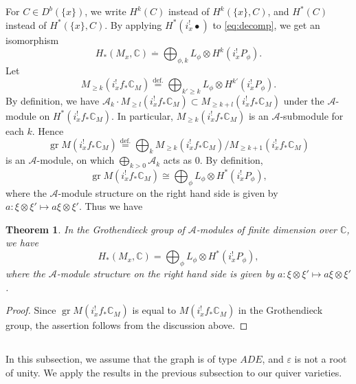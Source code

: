 \documentclass[12pt]{amsart}
\def\Bbb{\mathbb}
\newtheorem{Theorem}[equation]{Theorem}
\theoremstyle{definition}
\theoremstyle{remark}
\numberwithin{equation}{subsection}
\newcommand{\defeq}{\overset{\operatorname{\scriptstyle def.}}{=}}
\newcommand{\C}{{\Bbb C}}
\newcommand{\ngpiso}{\overset{.}{=}}
\begin{document}
For $C\in D^b(\{x\})$, we write $H^k(C)$ instead of $H^k(\{x\}, C)$,
and $H^*(C)$ instead of $H^*(\{x\}, C)$.
%
By applying $H^*(i_x^!\bullet)$ to \eqref{eq:decomp}, we get an
isomorphism
\begin{equation*}
   H_*(M_x,\C) \ngpiso
   \bigoplus_{\phi,k} L_{\phi}\otimes H^k(i_x^!P_\phi).
\end{equation*}
Let 
\[
 M_{\ge k}(i_x^!f_*\C_M) \defeq
  \bigoplus_{k'\ge k} L_{\phi}\otimes H^{k'}(i_x^!P_\phi).
\]
By definition, we have $\mathcal A_k\cdot M_{\ge l}(i_x^!f_*\C_M)
\subset M_{\ge k+l}(i_x^!f_*\C_M)$ under the $\mathcal A$-module on
$H^*(i_x^!f_*\C_M)$. In particular, $M_{\ge k}(i_x^!f_*\C_M)$ is
an $\mathcal A$-submodule for each $k$. Hence
\begin{equation*}
   \operatorname{gr} M(i_x^!f_*\C_M)
   \defeq \bigoplus_k  M_{\ge k}(i_x^!f_*\C_M)/ M_{\ge k+1}(i_x^!f_*\C_M)
\end{equation*}
is an $\mathcal A$-module, on which $\bigoplus_{k > 0} \mathcal A_k$
acts as $0$. By definition, 
\begin{equation*}
  \operatorname{gr} M(i_x^!f_*\C_M)
  \cong \bigoplus_\phi L_\phi\otimes H^*(i_x^!P_\phi),
\end{equation*}
where the $\mathcal A$-module structure on the right hand side is
given by
$a\colon \xi\otimes\xi'\mapsto a\xi\otimes\xi'$.
Thus we have
\begin{Theorem}
In the Grothendieck group of $\mathcal A$-modules of finite dimension
over $\C$, we have
\begin{equation*}
   H_*(M_x,\C) = \bigoplus_\phi L_\phi\otimes H^*(i_x^!P_\phi),
\end{equation*}
where the $\mathcal A$-module structure on the right hand side is
given by
$a\colon \xi\otimes\xi'\mapsto a\xi\otimes\xi'$.
\end{Theorem}

\begin{proof}
Since $\operatorname{gr} M(i_x^!f_*\C_M)$ is equal to
$M(i_x^!f_*\C_M)$ in the Grothendieck group, the assertion follows
from the discussion above.
\end{proof}

\subsection{}\label{subsec:std_decomp}
In this subsection, we assume that the graph is of type $ADE$, and
$\varepsilon$ is not a root of unity.
%
We apply the results in the previous subsection to our quiver
varieties.
\end{document}

